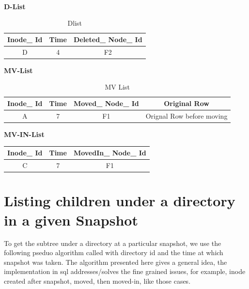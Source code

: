 \begin{table}[!h]
\textbf{D-List}\\

\begin{tabular}{|c|c|c|}
\hline
Inode\_ Id&Time&Deleted\_ Node\_ Id\\
\hline
D&4&F2\\
\hline
\end{tabular}
\label{table:dlist}
\caption{Dlist}
\end{table}

\begin{table}[!h]
\textbf{MV-List}\\

\begin{tabular}{|c|c|c|c|}
\hline
Inode\_ Id&Time&Moved\_ Node\_ Id&Original Row\\
\hline
A&7&F1&Orignal Row before moving\\
\hline
\end{tabular}
\caption{MV List}
\label{table:mvlist}
\end{table}


\textbf{MV-IN-List}\\

\begin{tabular}{|c|c|c|}
\hline
Inode\_ Id&Time&MovedIn\_ Node\_ Id\\
\hline
C&7&F1\\
\hline
\end{tabular}


\pagebreak

\section{Listing children under a directory in a given Snapshot}
To get the subtree under a directory at a particular snapshot, we use the following pseduo algorithm called with directory id and the time at which snapshot was taken. The algorithm presented here gives a general idea, the implementation in sql\cite{Snapshot-ls} addresses/solves the fine grained issues, for example, inode created after snapshot, moved, then moved-in, like those cases.

